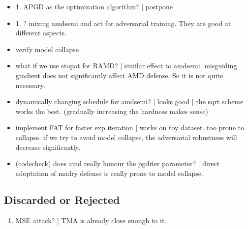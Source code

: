\begin{itemize}
	\item 1. APGD as the optimization algorithm? | postpone

	\item 1. ? mixing amdsemi and act for adversarial training. They are good
		at different aspects.

	\item verify model collapse

	\item [\cmark] what if we use stopat for RAMD? | similar effect to amdsemi.
		misguiding gradient does not significantly affect AMD defense. So it
		is not quite necessary.
	
	\item [\cmark] \checkmark dynamically changing schedule for amdsemi? |
		looks good | the sqrt scheme works the best. (gradually increasing the
		hardness makes sense)

	\item [\cmark] implement FAT for faster exp iteration | works on toy
		dataset. too prone to collapse. if we try to avoid model collapse, the
		adversarial robustness will decrease significantly.

	\item [\cmark] (codecheck) does amd really honour the pgditer parameter? |
		direct adoptation of madry defense is really prone to model collapse.

\end{itemize}


\subsection{Discarded or Rejected}

\begin{enumerate}

	\item \xmark
		MSE attack? | TMA is already close enough to it.

\end{enumerate}
